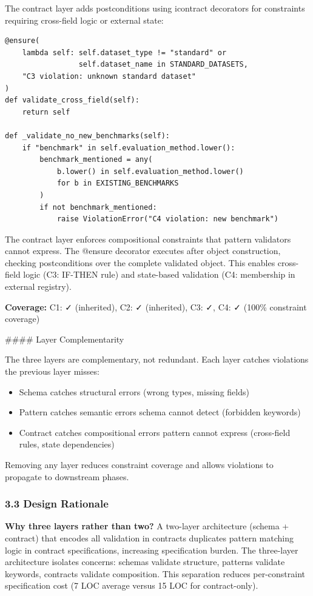 The contract layer adds postconditions using icontract decorators for constraints requiring cross-field logic or external state:

\begin{verbatim}
@ensure(
    lambda self: self.dataset_type != "standard" or 
                 self.dataset_name in STANDARD_DATASETS,
    "C3 violation: unknown standard dataset"
)
def validate_cross_field(self):
    return self

def _validate_no_new_benchmarks(self):
    if "benchmark" in self.evaluation_method.lower():
        benchmark_mentioned = any(
            b.lower() in self.evaluation_method.lower()
            for b in EXISTING_BENCHMARKS
        )
        if not benchmark_mentioned:
            raise ViolationError("C4 violation: new benchmark")
\end{verbatim}

The contract layer enforces compositional constraints that pattern validators cannot express. The @ensure decorator executes after object construction, checking postconditions over the complete validated object. This enables cross-field logic (C3: IF-THEN rule) and state-based validation (C4: membership in external registry).

\textbf{Coverage:} C1: ✓ (inherited), C2: ✓ (inherited), C3: ✓, C4: ✓ (100\% constraint coverage)

\#\#\#\# Layer Complementarity

The three layers are complementary, not redundant. Each layer catches violations the previous layer misses:

\begin{itemize}
\item Schema catches structural errors (wrong types, missing fields)
\item Pattern catches semantic errors schema cannot detect (forbidden keywords)
\item Contract catches compositional errors pattern cannot express (cross-field rules, state dependencies)
\end{itemize}

Removing any layer reduces constraint coverage and allows violations to propagate to downstream phases.

\subsubsection{3.3 Design Rationale}

\textbf{Why three layers rather than two?} A two-layer architecture (schema + contract) that encodes all validation in contracts duplicates pattern matching logic in contract specifications, increasing specification burden. The three-layer architecture isolates concerns: schemas validate structure, patterns validate keywords, contracts validate composition. This separation reduces per-constraint specification cost (7 LOC average versus 15 LOC for contract-only).

